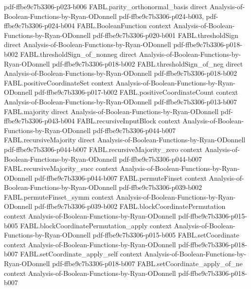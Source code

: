 \begin{theorem}
  {pdf-ffbe9c7b3306-p023-b006}
\proofstep
  {FABL.parity_orthonormal_basis}
  {direct}
  {Analysis-of-Boolean-Functions-by-Ryan-ODonnell}
  {pdf-ffbe9c7b3306-p024-b003,
    pdf-ffbe9c7b3306-p024-b004}
\proofstep
  {FABL.BooleanFunction}
  {context}
  {Analysis-of-Boolean-Functions-by-Ryan-ODonnell}
  {pdf-ffbe9c7b3306-p020-b001}
\proofstep
  {FABL.thresholdSign}
  {direct}
  {Analysis-of-Boolean-Functions-by-Ryan-ODonnell}
  {pdf-ffbe9c7b3306-p018-b002}
\proofstep
  {FABL.thresholdSign_of_nonneg}
  {direct}
  {Analysis-of-Boolean-Functions-by-Ryan-ODonnell}
  {pdf-ffbe9c7b3306-p018-b002}
\proofstep
  {FABL.thresholdSign_of_neg}
  {direct}
  {Analysis-of-Boolean-Functions-by-Ryan-ODonnell}
  {pdf-ffbe9c7b3306-p018-b002}
\proofstep
  {FABL.positiveCoordinateSet}
  {context}
  {Analysis-of-Boolean-Functions-by-Ryan-ODonnell}
  {pdf-ffbe9c7b3306-p017-b002}
\proofstep
  {FABL.positiveCoordinateCount}
  {context}
  {Analysis-of-Boolean-Functions-by-Ryan-ODonnell}
  {pdf-ffbe9c7b3306-p013-b007}
\proofstep
  {FABL.majority}
  {direct}
  {Analysis-of-Boolean-Functions-by-Ryan-ODonnell}
  {pdf-ffbe9c7b3306-p043-b004}
\proofstep
  {FABL.recursiveInputBlock}
  {context}
  {Analysis-of-Boolean-Functions-by-Ryan-ODonnell}
  {pdf-ffbe9c7b3306-p044-b007}
\proofstep
  {FABL.recursiveMajority}
  {direct}
  {Analysis-of-Boolean-Functions-by-Ryan-ODonnell}
  {pdf-ffbe9c7b3306-p044-b007}
\proofstep
  {FABL.recursiveMajority_zero}
  {context}
  {Analysis-of-Boolean-Functions-by-Ryan-ODonnell}
  {pdf-ffbe9c7b3306-p044-b007}
\proofstep
  {FABL.recursiveMajority_succ}
  {context}
  {Analysis-of-Boolean-Functions-by-Ryan-ODonnell}
  {pdf-ffbe9c7b3306-p044-b007}
\proofstep
  {FABL.permuteFinset}
  {context}
  {Analysis-of-Boolean-Functions-by-Ryan-ODonnell}
  {pdf-ffbe9c7b3306-p039-b002}
\proofstep
  {FABL.permuteFinset_symm}
  {context}
  {Analysis-of-Boolean-Functions-by-Ryan-ODonnell}
  {pdf-ffbe9c7b3306-p039-b002}
\proofstep
  {FABL.blockCoordinatePermutation}
  {context}
  {Analysis-of-Boolean-Functions-by-Ryan-ODonnell}
  {pdf-ffbe9c7b3306-p015-b005}
\proofstep
  {FABL.blockCoordinatePermutation_apply}
  {context}
  {Analysis-of-Boolean-Functions-by-Ryan-ODonnell}
  {pdf-ffbe9c7b3306-p015-b005}
\proofstep
  {FABL.setCoordinate}
  {context}
  {Analysis-of-Boolean-Functions-by-Ryan-ODonnell}
  {pdf-ffbe9c7b3306-p018-b007}
\proofstep
  {FABL.setCoordinate_apply_self}
  {context}
  {Analysis-of-Boolean-Functions-by-Ryan-ODonnell}
  {pdf-ffbe9c7b3306-p018-b007}
\proofstep
  {FABL.setCoordinate_apply_of_ne}
  {context}
  {Analysis-of-Boolean-Functions-by-Ryan-ODonnell}
  {pdf-ffbe9c7b3306-p018-b007}

\end{theorem}
